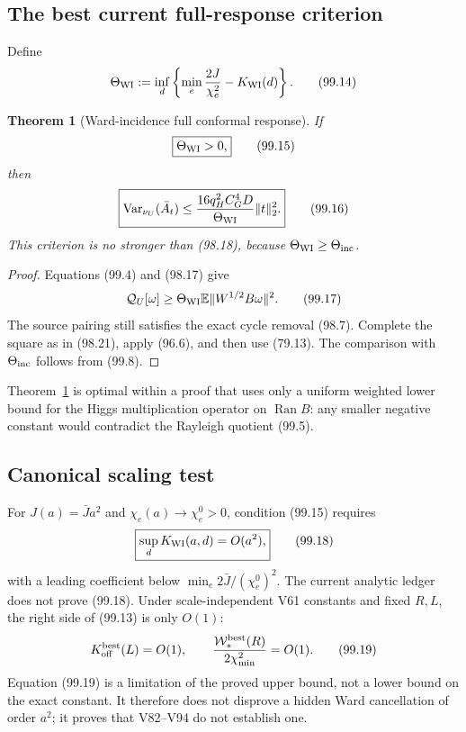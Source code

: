 \documentclass[11pt]{article}
\newtheorem{theorem}{Theorem}[section]
\theoremstyle{remark}
\begin{document}
\subsection{The best current full-response criterion}

Define
\[
 \Theta_{\rm WI}
 :=\inf_d\left\{
 \min_e\frac{2J}{\chi_e^2}-K_{\rm WI}(d)
 \right\}.                                         \tag{99.14}
\]

\begin{theorem}[Ward-incidence full conformal response]
\label{thm:v17v99-response}
If
\[
\boxed{\Theta_{\rm WI}>0,}                          \tag{99.15}
\]
then
\[
\boxed{
 \operatorname{Var}_{\nu_U}(\bar A_t)
 \leq\frac{16q_H^2C_G^4D}{\Theta_{\rm WI}}
       \|t\|_2^2.}                                  \tag{99.16}
\]
This criterion is no stronger than (98.18), because
\(\Theta_{\rm WI}\geq\Theta_{\rm inc}\).
\end{theorem}

\begin{proof}
Equations (99.4) and (98.17) give
\[
 \mathcal Q_U[\omega]
 \geq\Theta_{\rm WI}
 \mathbb E\|W^{1/2}B\omega\|^2.                    \tag{99.17}
\]
The source pairing still satisfies the exact cycle removal (98.7).
Complete the square as in (98.21), apply (96.6), and then use (79.13).
The comparison with \(\Theta_{\rm inc}\) follows from (99.8).
\end{proof}

Theorem~\ref{thm:v17v99-response} is optimal within a proof that uses
only a uniform weighted lower bound for the Higgs multiplication
operator on \(\operatorname{Ran}B\): any smaller negative constant
would contradict the Rayleigh quotient (99.5).

\subsection{Canonical scaling test}

For \(J(a)=\bar Ja^2\) and
\(\chi_e(a)\to\chi_e^0>0\), condition (99.15) requires
\[
\boxed{
 \sup_dK_{\rm WI}(a,d)=O(a^2),}                     \tag{99.18}
\]
with a leading coefficient below
\(\min_e2\bar J/(\chi_e^0)^2\).  The current analytic ledger does not
prove (99.18).  Under scale-independent V61 constants and fixed
\(R,L\), the right side of (99.13) is only \(O(1)\):
\[
 K_{\rm off}^{\rm best}(L)=O(1),
 \qquad
 \frac{\mathcal W_*^{\rm best}(R)}
      {2\chi_{\min}^2}=O(1).                        \tag{99.19}
\]
Equation (99.19) is a limitation of the proved upper bound, not a lower
bound on the exact constant.  It therefore does not disprove a hidden
Ward cancellation of order \(a^2\); it proves that V82--V94 do not
establish one.
\end{document}
